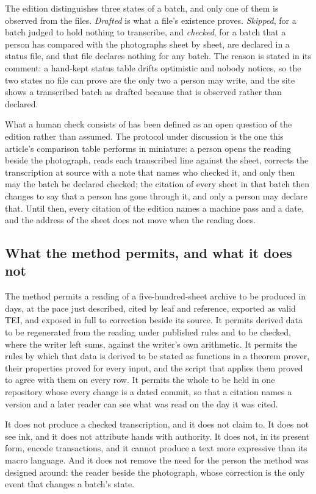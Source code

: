 \documentclass[11pt]{article}
\begin{document}
The edition distinguishes three states of a batch, and only one of them is observed from the files. \emph{Drafted} is what a file's existence proves. \emph{Skipped}, for a batch judged to hold nothing to transcribe, and \emph{checked}, for a batch that a person has compared with the photographs sheet by sheet, are declared in a status file, and that file declares nothing for any batch. The reason is stated in its comment: a hand-kept status table drifts optimistic and nobody notices, so the two states no file can prove are the only two a person may write, and the site shows a transcribed batch as drafted because that is observed rather than declared.

What a human check consists of has been defined as an open question of the edition rather than assumed. The protocol under discussion is the one this article's comparison table performs in miniature: a person opens the reading beside the photograph, reads each transcribed line against the sheet, corrects the transcription at source with a note that names who checked it, and only then may the batch be declared checked; the citation of every sheet in that batch then changes to say that a person has gone through it, and only a person may declare that. Until then, every citation of the edition names a machine pass and a date, and the address of the sheet does not move when the reading does.



\subsection{What the method permits, and what it does not}

The method permits a reading of a five-hundred-sheet archive to be produced in days, at the pace just described, cited by leaf and reference, exported as valid TEI, and exposed in full to correction beside its source. It permits derived data to be regenerated from the reading under published rules and to be checked, where the writer left sums, against the writer's own arithmetic. It permits the rules by which that data is derived to be stated as functions in a theorem prover, their properties proved for every input, and the script that applies them proved to agree with them on every row. It permits the whole to be held in one repository whose every change is a dated commit, so that a citation names a version and a later reader can see what was read on the day it was cited.

It does not produce a checked transcription, and it does not claim to. It does not see ink, and it does not attribute hands with authority. It does not, in its present form, encode transactions, and it cannot produce a text more expressive than its macro language. And it does not remove the need for the person the method was designed around: the reader beside the photograph, whose correction is the only event that changes a batch's state.
\end{document}
